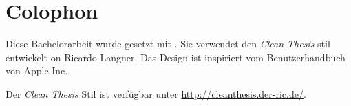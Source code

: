 \pagestyle{empty}
\hfill
\vfill
{}
\section*{Colophon}

Diese Bachelorarbeit wurde gesetzt mit \LaTeXe. Sie verwendet den \textit{Clean Thesis} stil entwickelt on Ricardo Langner. Das Design ist inspiriert vom Benutzerhandbuch von Apple Inc.

Der \textit{Clean Thesis} Stil ist verfügbar unter \url{http://cleanthesis.der-ric.de/}.


